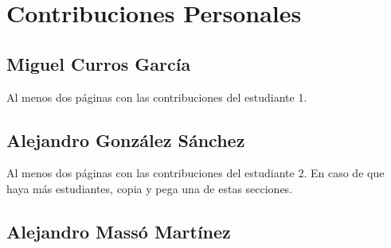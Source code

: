 \chapter*{Contribuciones Personales}
\label{cap:contribucionesPersonales}

\section*{Miguel Curros García}
Al menos dos páginas con las contribuciones del estudiante 1.

\section*{Alejandro González Sánchez}
Al menos dos páginas con las contribuciones del estudiante 2. En caso de que haya más estudiantes, copia y pega una de estas secciones.

\section*{Alejandro Massó Martínez}

